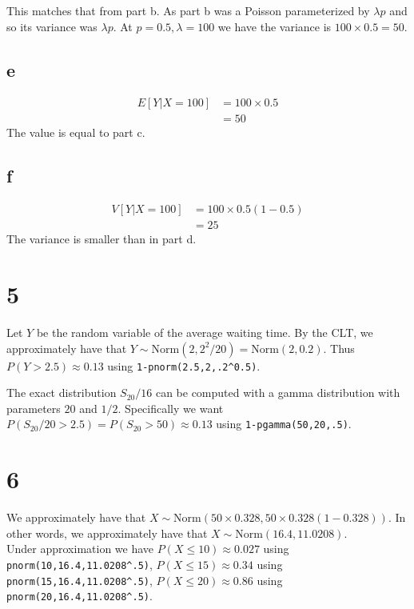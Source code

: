 \documentclass[10pt]{article}
\begin{document}
This matches that from part b. As part b was a Poisson parameterized by $\lambda p$ and so its variance was $\lambda p.$ At $p=0.5,\lambda=100$ we have the variance is $100\times0.5=50.$

\subsection*{e}
\begin{align*}
    E[Y|X=100]&= 100 \times 0.5\\
    &= 50
\end{align*}
The value is equal to part c.

\subsection*{f}
\begin{align*}
    V[Y|X=100]&= 100 \times 0.5 (1-0.5)\\
    &= 25
\end{align*}
The variance is smaller than in part d.

\section*{5}

Let $Y$ be the random variable of the average waiting time. By the CLT, we approximately have that $Y\sim\text{Norm}(2, 2^2/20)=\text{Norm}(2,0.2).$ Thus $P(Y>2.5)\approx 0.13$ using \texttt{1-pnorm(2.5,2,.2\textasciicircum0.5)}.

The exact distribution $S_{20}/16$ can be computed with a gamma distribution with parameters $20$ and $1/2$. Specifically we want $P(S_{20}/20 > 2.5) = P(S_{20}>50) \approx 0.13$ using \texttt{1-pgamma(50,20,.5)}.

\section*{6}
We approximately have that $X\sim\text{Norm}(50\times0.328, 50\times0.328(1-0.328)).$ In other words, we approximately have that $X\sim\text{Norm}(16.4, 11.0208).$\\

Under approximation we have $P(X\le10)\approx0.027$ using \texttt{pnorm(10,16.4,11.0208\textasciicircum.5)},
$P(X\le15)\approx0.34$ using \texttt{pnorm(15,16.4,11.0208\textasciicircum.5)},
$P(X\le20)\approx0.86$ using \texttt{pnorm(20,16.4,11.0208\textasciicircum.5)}.
\end{document}
